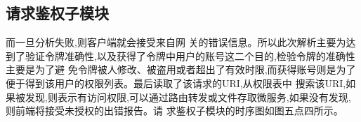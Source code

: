 \begin{center}
    \renewcommand\arraystretch{1.5}{
    }
\end{center}

\subsection{请求鉴权子模块}

而一旦分析失败,则客户端就会接受来自网
关的错误信息。所以此次解析主要为达到了验证令牌准确性,以及获得了令牌中用户的账号这二个目的,检验令牌的准确性主要是为了避
免令牌被人修改、被盗用或者超出了有效时限,而获得账号则是为了便于得到该用户的权限列表。最后读取了该请求的URI,从权限表中
搜索该URI,如果被发现,则表示有访问权限,可以通过路由转发或文件存取微服务,如果没有发现,则前端将接受未授权的出错报告。请
求鉴权子模块的时序图如图五点四所示。

